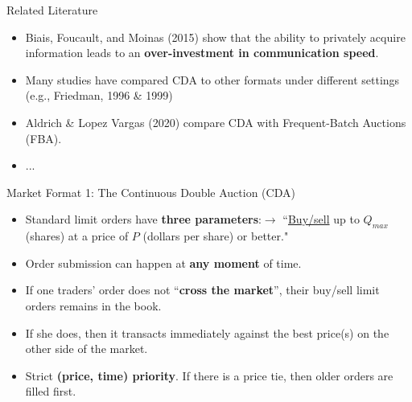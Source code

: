 \documentclass[10pt]{beamer}
\begin{document}
\begin{frame}{Related Literature}
    \begin{itemize}
        \item  Biais, Foucault, and Moinas (2015) show that the ability to privately acquire information leads to an \textbf{over-investment in communication speed}. %
    
    
        \item Many studies have compared CDA to other formats under different settings (e.g., Friedman, 1996 \& 1999)
    
        \item Aldrich \& Lopez Vargas (2020) compare CDA with Frequent-Batch Auctions (FBA). %


    
        \item ...
    \end{itemize}
\end{frame}

\begin{frame}{Market Format 1: The Continuous Double Auction (CDA)}
    \begin{itemize}
        \item Standard limit orders have \textbf{three parameters}:$\rightarrow$ ``\underline{Buy/sell} up to \underline{$Q_{max}$} (shares) at a price of \underline{$P$} (dollars per share) or better."
        \item Order submission can happen at \textbf{any moment} of time. 
        \item If one traders' order does not ``\textbf{cross the market}'', their buy/sell limit orders remains in the book. 
        \item If she does, then it transacts immediately against the best price(s) on the other side of the market.
        \item Strict \textbf{(price, time) priority}. If there is a price tie, then older orders are filled first.
    \end{itemize} 
\end{frame}
\end{document}
